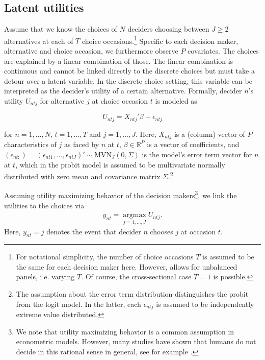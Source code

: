 \documentclass[article]{jss}
\begin{document}
\subsection{Latent utilities} \label{subsec:latent_utilities}

Assume that we know the choices of $N$ deciders choosing between $J \geq 2$ alternatives at each of $T$ choice occasions.\footnote{For notational simplicity, the number of choice occasions $T$ is assumed to be the same for each decision maker here. However,  allows for unbalanced panels, i.e. varying $T$. Of course, the cross-sectional case $T = 1$ is possible.} Specific to each decision maker, alternative and choice occasion, we furthermore observe $P$ covariates. The choices are explained by a linear combination of those. The linear combination is continuous and cannot be linked directly to the discrete choices but must take a detour over a latent variable. In the discrete choice setting, this variable can be interpreted as the decider's utility of a certain alternative. Formally, decider $n$'s utility $U_{ntj}$ for alternative $j$ at choice occasion $t$ is modeled as

\begin{equation}
  \label{eq:utility}
  U_{ntj} = X_{ntj}'\beta + \epsilon_{ntj}
\end{equation}

for $n=1,\dots,N$, $t=1,\dots,T$ and $j=1,\dots,J$. Here, $X_{ntj}$ is a (column) vector of $P$ characteristics of $j$ as faced by $n$ at $t$, $\beta \in {\mathbb R}^{P}$ is a vector of coefficients, and $(\epsilon_{nt:}) = (\epsilon_{nt1},\dots,\epsilon_{ntJ})' \sim \text{MVN}_{J} (0,\Sigma)$ is the model's error term vector for $n$ at $t$, which in the probit model is assumed to be multivariate normally distributed with zero mean and covariance matrix $\Sigma$.\footnote{The assumption about the error term distribution distinguishes the probit from the logit model. In the latter, each $\epsilon_{ntj}$ is assumed to be independently extreme value distributed.}

Assuming utility maximizing behavior of the decision makers\footnote{We note that utility maximizing behavior is a common assumption in econometric models. However, many studies have shown that humans do not decide in this rational sense in general, see for example \cite{Hewig:2011}.}, we link the utilities to the choices via
\begin{align*}
   y_{nt} = \operatorname*{argmax}_{j = 1,\dots,J} U_{ntj}.
\end{align*}
Here, $y_{nt}=j$ denotes the event that decider $n$ chooses $j$ at occasion $t$.
\end{document}
